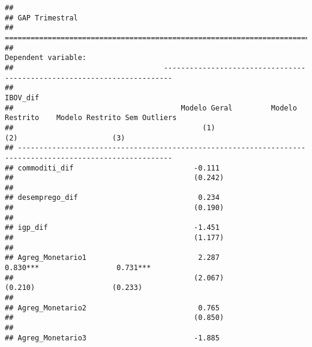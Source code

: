 \documentclass[
]{article}
\begin{document}
\begin{verbatim}
## 
## GAP Trimestral
## ==========================================================================================================
##                                                             Dependent variable:                           
##                                   ------------------------------------------------------------------------
##                                                                   IBOV_dif                                
##                                       Modelo Geral         Modelo Restrito    Modelo Restrito Sem Outliers
##                                            (1)                   (2)                      (3)             
## ----------------------------------------------------------------------------------------------------------
## commoditi_dif                            -0.111                                                           
##                                          (0.242)                                                          
##                                                                                                           
## desemprego_dif                            0.234                                                           
##                                          (0.190)                                                          
##                                                                                                           
## igp_dif                                  -1.451                                                           
##                                          (1.177)                                                          
##                                                                                                           
## Agreg_Monetario1                          2.287               0.830***                  0.731***          
##                                          (2.067)               (0.210)                  (0.233)           
##                                                                                                           
## Agreg_Monetario2                          0.765                                                           
##                                          (0.850)                                                          
##                                                                                                           
## Agreg_Monetario3                         -1.885                                                           

\end{verbatim}
\end{document}
